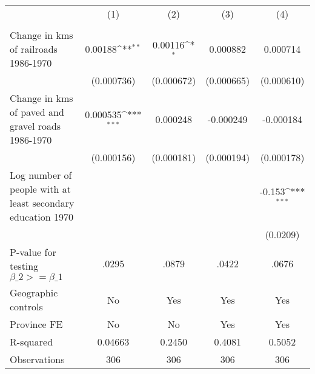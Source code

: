 {
\def\sym#1{\ifmmode^{#1}\else\(^{#1}\)\fi}
\begin{tabular}{l*{4}{c}}
\hline\hline
                &\multicolumn{1}{c}{(1)}&\multicolumn{1}{c}{(2)}&\multicolumn{1}{c}{(3)}&\multicolumn{1}{c}{(4)}\\
                &\multicolumn{1}{c}{}&\multicolumn{1}{c}{}&\multicolumn{1}{c}{}&\multicolumn{1}{c}{}\\
\hline
Change in kms of railroads 1986-1970&  0.00188\sym{**} &  0.00116\sym{*}  & 0.000882         & 0.000714         \\
                &(0.000736)         &(0.000672)         &(0.000665)         &(0.000610)         \\
[1em]
Change in kms of paved and gravel roads 1986-1970& 0.000535\sym{***}& 0.000248         &-0.000249         &-0.000184         \\
                &(0.000156)         &(0.000181)         &(0.000194)         &(0.000178)         \\
[1em]
Log number of people with at least secondary education 1970&                  &                  &                  &   -0.153\sym{***}\\
                &                  &                  &                  & (0.0209)         \\
\hline
P-value for testing $\beta\_{2} >= \beta\_{1}$&    .0295         &    .0879         &    .0422         &    .0676         \\
Geographic controls&       No         &      Yes         &      Yes         &      Yes         \\
Province FE     &       No         &       No         &      Yes         &      Yes         \\
R-squared       &  0.04663         &   0.2450         &   0.4081         &   0.5052         \\
Observations    &      306         &      306         &      306         &      306         \\
\hline\hline
\end{tabular}
}
